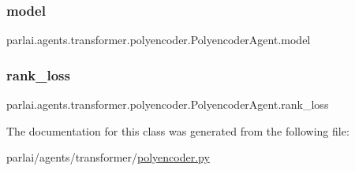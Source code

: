 \subsubsection{\texorpdfstring{model}{model}}
{\footnotesize\ttfamily parlai.\+agents.\+transformer.\+polyencoder.\+Polyencoder\+Agent.\+model}

\mbox{\label{classparlai_1_1agents_1_1transformer_1_1polyencoder_1_1PolyencoderAgent_a20e36e9eb037ae6f71ae661e94bb6445}} 
\subsubsection{\texorpdfstring{rank\+\_\+loss}{rank\_loss}}
{\footnotesize\ttfamily parlai.\+agents.\+transformer.\+polyencoder.\+Polyencoder\+Agent.\+rank\+\_\+loss}



The documentation for this class was generated from the following file\+:\begin{DoxyCompactItemize}
\item 
parlai/agents/transformer/\hyperlink{polyencoder_8py}{polyencoder.\+py}\end{DoxyCompactItemize}
